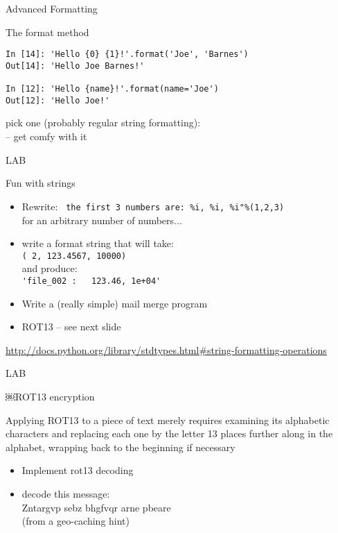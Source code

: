 \documentclass{beamer}
\begin{document}
\begin{frame}[fragile]{Advanced Formatting}

{\Large The format method}

\begin{verbatim}
In [14]: 'Hello {0} {1}!'.format('Joe', 'Barnes')
Out[14]: 'Hello Joe Barnes!'

In [12]: 'Hello {name}!'.format(name='Joe')
Out[12]: 'Hello Joe!'
\end{verbatim}
\vfill
{\Large pick one (probably regular string formatting): \\
  -- get comfy with it }

\end{frame}


\begin{frame}[fragile]{LAB}

{\Large Fun with strings}

\begin{itemize}
  \item Rewrite: \verb| the first 3 numbers are: %i, %i, %i"%(1,2,3)| \\
        for an arbitrary number of numbers...
  \item write a format string that will take:\\
        \verb|( 2, 123.4567, 10000)| \\
        and produce: \\
        \verb|'file_002 :   123.46, 1e+04'|
  \item Write a (really simple) mail merge program
  \item ROT13 -- see next slide
\end{itemize}

\vfill
\url{http://docs.python.org/library/stdtypes.html#string-formatting-operations}
\end{frame}

\begin{frame}[fragile]{LAB}

\vfill
\Large￼ROT13 encryption

\vfill
Applying ROT13 to a piece of text merely requires examining its alphabetic
characters and replacing each one by the letter 13 places further along in
the alphabet, wrapping back to the beginning if necessary

\begin{itemize}
  \item Implement rot13 decoding 
  \item  decode this message: \\
     \hspace{0.5in} Zntargvp sebz bhgfvqr arne pbeare \\
     \hspace{0.5in} (from a geo-caching hint)
\end{itemize}

\end{frame}
\end{document}
